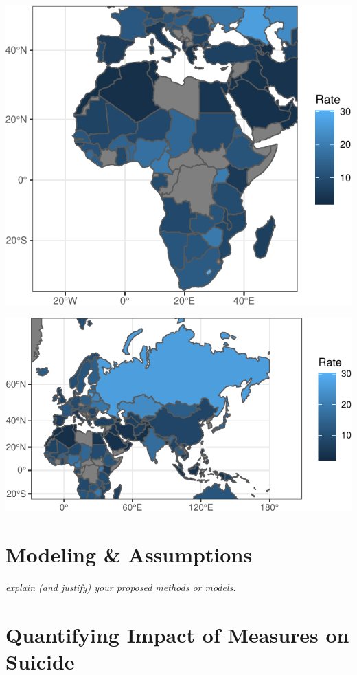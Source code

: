 \documentclass[]{article}
\begin{document}
\begin{center}\includegraphics{Project_Report_files/figure-latex/africa_map_plot-1} \end{center}

\begin{center}\includegraphics{Project_Report_files/figure-latex/russia_map_plot-1} \end{center}

\section{Modeling \& Assumptions}\label{modeling-assumptions}

\emph{explain (and justify) your proposed methods or models.}

\section{Quantifying Impact of Measures on
Suicide}\label{quantifying-impact-of-measures-on-suicide}
\end{document}

